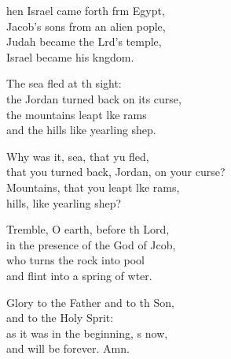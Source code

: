 \settowidth{\versewidth}{that you turned back, Jordan, on your course?}
\begin{psalmverse}%
  \begin{patverse}
hen Israel came forth frm Egypt,\Med\\
Jacob’s sons from an alien pople,\\
Judah became the Lrd’s temple,\Med\\
Israel became his k\pointup{\i}ngdom.

The sea fled at th sight:\Med\\
the Jordan turned back on its curse,\\
the mountains leapt l\pointup{\i}ke rams\Med\\
and the hills like yearling shep.

Why was it, sea, that yu fled,\Med\\
that you turned back, Jordan, on your curse?\\
Mountains, that you leapt l\pointup{\i}ke rams,\Med\\
hills, like yearling shep?

Tremble, O earth, before th Lord,\Med\\
in the presence of the God of Jcob,\\
who turns the rock into  pool\Med\\
and flint into a spring of wter.

Glory to the Father and to th Son,\Med\\
and to the Holy Sp\pointup{\i}rit:\\
as it was in the beginning, \pointup{\i}s now,\Med\\
and will be forever. Amn.
  \end{patverse}
\end{psalmverse}
